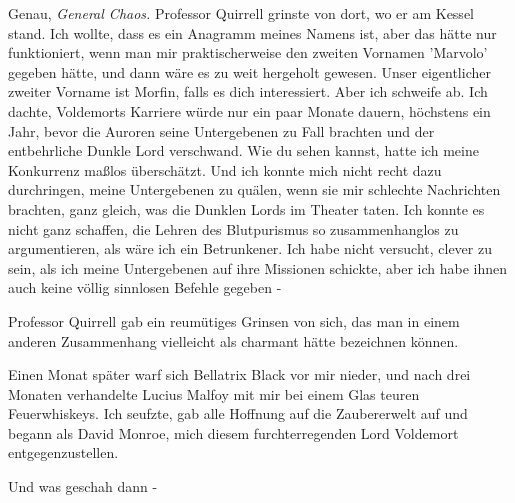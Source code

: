 \glqq{}Genau, \emph{General Chaos.}\grqq{} Professor Quirrell grinste von dort, wo er
am Kessel stand. \glqq{}Ich wollte, dass es ein Anagramm meines Namens ist, aber
das hätte nur funktioniert, wenn man mir praktischerweise den zweiten Vornamen
'Marvolo' gegeben hätte, und dann wäre es zu weit hergeholt gewesen. Unser
eigentlicher zweiter Vorname ist Morfin, falls es dich interessiert. Aber ich
schweife ab. Ich dachte, Voldemorts Karriere würde nur ein paar Monate dauern,
höchstens ein Jahr, bevor die Auroren seine Untergebenen zu Fall brachten und
der entbehrliche Dunkle Lord verschwand. Wie du sehen kannst, hatte ich meine
Konkurrenz maßlos überschätzt. Und ich konnte mich nicht recht dazu durchringen,
meine Untergebenen zu quälen, wenn sie mir schlechte Nachrichten brachten, ganz
gleich, was die Dunklen Lords im Theater taten. Ich konnte es nicht ganz
schaffen, die Lehren des Blutpurismus so zusammenhanglos zu argumentieren, als
wäre ich ein Betrunkener. Ich habe nicht versucht, clever zu sein, als ich meine
Untergebenen auf ihre Missionen schickte, aber ich habe ihnen auch keine völlig
sinnlosen Befehle gegeben -\grqq{}

Professor Quirrell gab ein reumütiges Grinsen von sich, das man in einem anderen
Zusammenhang vielleicht als charmant hätte bezeichnen können.

\glqq{}Einen Monat später warf sich Bellatrix Black vor mir nieder, und nach drei
Monaten verhandelte Lucius Malfoy mit mir bei einem Glas teuren Feuerwhiskeys.
Ich seufzte, gab alle Hoffnung auf die Zaubererwelt auf und begann als David
Monroe, mich diesem furchterregenden Lord Voldemort entgegenzustellen.\grqq{}

\glqq{}Und was geschah dann -\grqq{}


